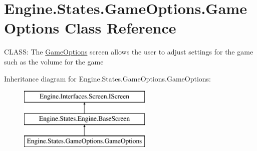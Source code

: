\hypertarget{a00558}{}\section{Engine.\+States.\+Game\+Options.\+Game\+Options Class Reference}
\label{a00558}


C\+L\+A\+SS\+: The \hyperlink{a00558}{Game\+Options} screen allows the user to adjust settings for the game such as the volume for the game  


Inheritance diagram for Engine.\+States.\+Game\+Options.\+Game\+Options\+:\begin{figure}[H]
\begin{center}
\leavevmode
\includegraphics[height=3.000000cm]{dc/dea/a00558}
\end{center}
\end{figure}
